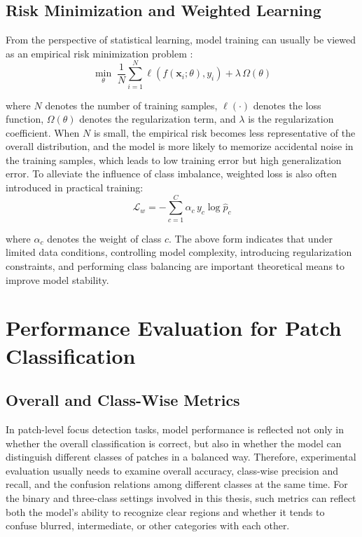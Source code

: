\subsection{Risk Minimization and Weighted Learning}
\par From the perspective of statistical learning, model training can usually be
viewed as an empirical risk minimization problem \cite{murphy2022pml}:
\begin{equation}
    \min_{\theta}\;
    \frac{1}{N}\sum_{i=1}^{N}\ell\!\left(f(\mathbf{x}_i;\theta),y_i\right)
    +\lambda\,\Omega(\theta)
    \label{eq:erm-basic}
\end{equation}
\par where $N$ denotes the number of training samples, $\ell(\cdot)$ denotes
the loss function, $\Omega(\theta)$ denotes the regularization term, and
$\lambda$ is the regularization coefficient. When $N$ is small, the empirical
risk becomes less representative of the overall distribution, and the model is
more likely to memorize accidental noise in the training samples, which leads
to low training error but high generalization error. To alleviate the influence
of class imbalance, weighted loss is also often introduced in practical
training:
\begin{equation}
    \mathcal{L}_{w}=
    -\sum_{c=1}^{C}\alpha_c\,y_c\log \hat{p}_c
    \label{eq:weighted-loss-basic}
\end{equation}
\par where $\alpha_c$ denotes the weight of class $c$. The above form indicates
that under limited data conditions, controlling model complexity, introducing
regularization constraints, and performing class balancing are important
theoretical means to improve model stability.

\section{Performance Evaluation for Patch Classification}
\subsection{Overall and Class-Wise Metrics}
\par In patch-level focus detection tasks, model performance is reflected not
only in whether the overall classification is correct, but also in whether the
model can distinguish different classes of patches in a balanced way.
Therefore, experimental evaluation usually needs to examine overall accuracy,
class-wise precision and recall, and the confusion relations among different
classes at the same time. For the binary and three-class settings involved in
this thesis, such metrics can reflect both the model's ability to recognize
clear regions and whether it tends to confuse blurred, intermediate, or other
categories with each other.

